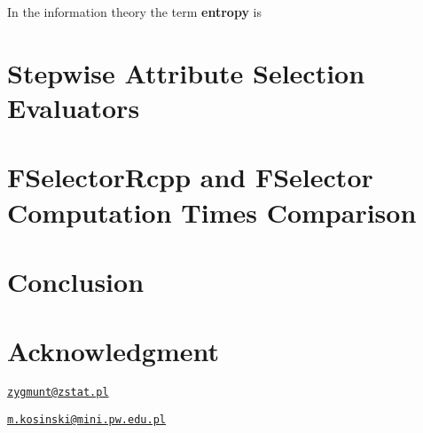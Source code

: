In the information theory the term \textbf{entropy}
\citep{Shannon:2001:MTC:584091.584093} is

\section{Stepwise Attribute Selection
Evaluators}\label{stepwise-attribute-selection-evaluators}

\section{FSelectorRcpp and FSelector Computation Times
Comparison}\label{fselectorrcpp-and-fselector-computation-times-comparison}

\section{Conclusion}\label{conclusion}

\section{Acknowledgment}\label{acknowledgment}



\address{%
Zygmunt Zawadzki\\
\\
\\
}
\href{mailto:zygmunt@zstat.pl}{\nolinkurl{zygmunt@zstat.pl}}

\address{%
Marcin Kosiński\\
Warsaw Univeristy of Technology\\
Faculty of Mathematics and Information Science\\ Koszykowa 75, Warsaw Poland\\
}
\href{mailto:m.kosinski@mini.pw.edu.pl}{\nolinkurl{m.kosinski@mini.pw.edu.pl}}


